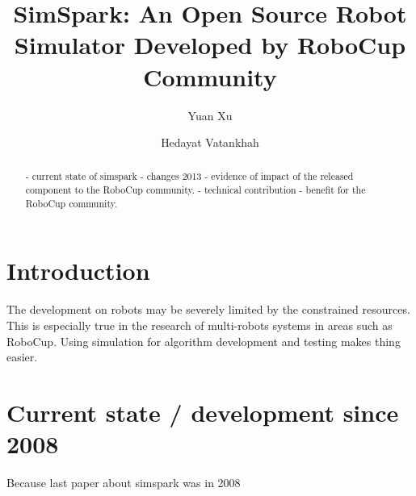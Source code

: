\documentclass{llncs}
\begin{document}
\title{SimSpark: An Open Source Robot Simulator Developed by RoboCup Community}

\author{Yuan Xu \and Hedayat Vatankhah}


\maketitle

\begin{abstract}
  - current state of simspark
  - changes 2013
  - evidence of impact of the released component to the RoboCup community.
  - technical contribution
  - benefit for the RoboCup community.
\end{abstract}

\section{Introduction}
The development on robots may be severely limited by the constrained resources.
This is especially true in the research of multi-robots systems in areas such as RoboCup.
Using simulation for algorithm development and testing makes thing easier.

\cite{Boedecker2008,OR05}



\section{Current state / development since 2008}
Because last paper about simspark was in 2008
\end{document}
